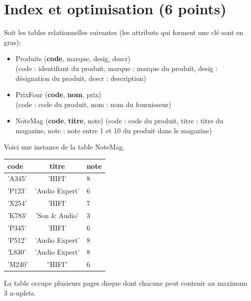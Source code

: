 \documentclass[french]{article}
\begin{document}
\section{Index et optimisation (6 points)}

Soit les tables relationnelles suivantes (les attributs qui forment 
une clé sont en gras):

\begin{itemize}
  \item Produits  (\textbf{code}, marque, desig, descr)\\
     (code : identifiant du produit, marque : marque du produit,
         desig : désignation du produit, descr : description)

  \item PrixFour (\textbf{code}, \textbf{nom}, prix)\\
   (code : code du produit, nom : nom du fournisseur)

  \item NoteMag    (\textbf{code}, \textbf{titre}, note)
     (code : code du produit,  titre : titre du magazine,
        note : note entre 1 et 10 du produit dans le magazine)
\end{itemize}

Voici une instance de la table NoteMag.

\begin{center}
\begin{tabular}{l|c|l}
code & titre & note\\
\hline
'A345' 	& 'HIFI' &	8\\
'P123' & 'Audio Expert' & 6\\
'X254' & 'HIFI' & 7\\
'K783' & 'Son \& Audio'&	3\\
'P345' & 'HIFI' & 6\\
'P512' & 'Audio Expert' & 8\\
'L830' & 'Audio Expert' & 8\\
'M240' & ''HIFI'' & 6\\
\hline
\end{tabular}
\end{center}


La table occupe plusieurs pages disque dont chacune peut contenir au maximum 3
n-uplets.
\end{document}
